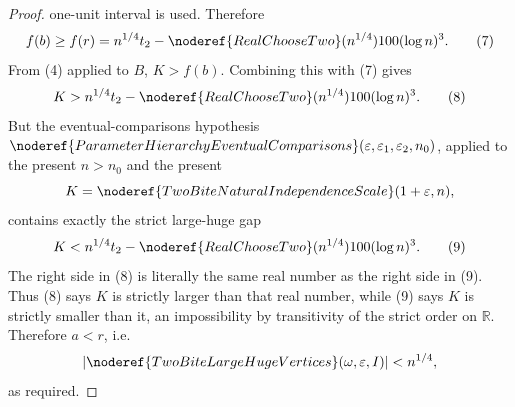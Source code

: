 \begin{proof}
one-unit interval is used.  Therefore
\[
f(b)\ge f(r)
=n^{1/4}t_2
 -\noderef{RealChooseTwo}(n^{1/4})100(\log n)^3. \tag{7}
\]
From (4) applied to \(B\), \(K>f(b)\).  Combining this with (7) gives
\[
K>
n^{1/4}t_2
 -\noderef{RealChooseTwo}(n^{1/4})100(\log n)^3. \tag{8}
\]
But the eventual-comparisons hypothesis
\(\noderef{ParameterHierarchyEventualComparisons}
(\varepsilon,\varepsilon_1,\varepsilon_2,n_0)\), applied to the present
\(n>n_0\) and the present
\[
K=\noderef{TwoBiteNaturalIndependenceScale}(1+\varepsilon,n),
\]
contains exactly the strict large-huge gap
\[
K<
n^{1/4}t_2
 -\noderef{RealChooseTwo}(n^{1/4})100(\log n)^3. \tag{9}
\]
The right side in (8) is literally the same real number as the right side in
(9).  Thus (8) says \(K\) is strictly larger than that real number, while (9)
says \(K\) is strictly smaller than it, an impossibility by transitivity of
the strict order on \(\mathbb R\).  Therefore \(a<r\), i.e.
\[
|\noderef{TwoBiteLargeHugeVertices}(\omega,\varepsilon,I)|<n^{1/4},
\]
as required.
\end{proof}
